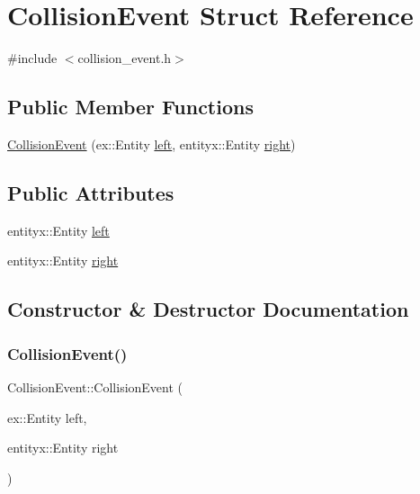 \hypertarget{structCollisionEvent}{}\section{Collision\+Event Struct Reference}
\label{structCollisionEvent}


{\ttfamily \#include $<$collision\+\_\+event.\+h$>$}

\subsection*{Public Member Functions}
\begin{DoxyCompactItemize}
\item 
\hyperlink{structCollisionEvent_a09fc3a9da18648340e9442cfb511c34c}{Collision\+Event} (ex\+::\+Entity \hyperlink{structCollisionEvent_ab04ed3aa79522e3f296245e39f7ba846}{left}, entityx\+::\+Entity \hyperlink{structCollisionEvent_a665ecc7b6b9b4d54b44ab9d0d9930984}{right})
\end{DoxyCompactItemize}
\subsection*{Public Attributes}
\begin{DoxyCompactItemize}
\item 
entityx\+::\+Entity \hyperlink{structCollisionEvent_ab04ed3aa79522e3f296245e39f7ba846}{left}
\item 
entityx\+::\+Entity \hyperlink{structCollisionEvent_a665ecc7b6b9b4d54b44ab9d0d9930984}{right}
\end{DoxyCompactItemize}


\subsection{Constructor \& Destructor Documentation}
\mbox{\label{structCollisionEvent_a09fc3a9da18648340e9442cfb511c34c}} 
\subsubsection{\texorpdfstring{Collision\+Event()}{CollisionEvent()}}
{\footnotesize\ttfamily Collision\+Event\+::\+Collision\+Event (\begin{DoxyParamCaption}\item[{ex\+::\+Entity}]{left,  }\item[{entityx\+::\+Entity}]{right }\end{DoxyParamCaption})\hspace{0.3cm}{\ttfamily [inline]}}



